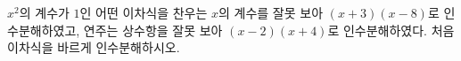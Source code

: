 $x^2$의 계수가 $1$인 어떤 이차식을 찬우는 $x$의 계수를 잘못 보아 $(x+3)(x-8)$로 인수분해하였고, 연주는 상수항을 잘못 보아 $(x-2)(x+4)$로 인수분해하였다. 처음 이차식을 바르게 인수분해하시오.
